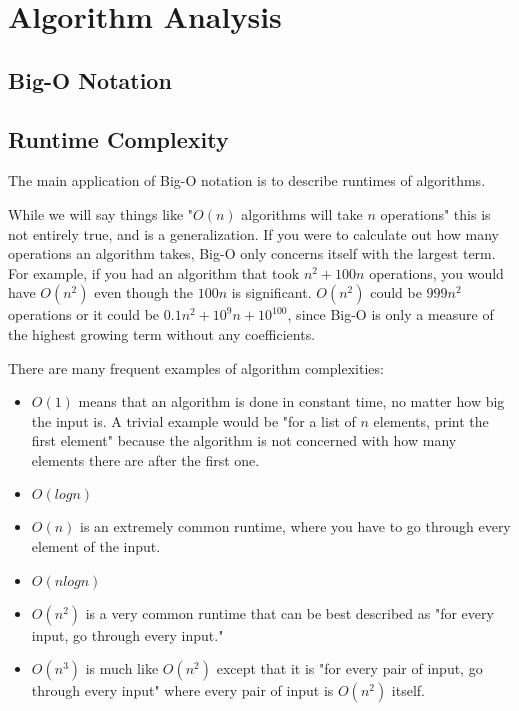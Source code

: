 \section{Algorithm Analysis}

\subsection{Big-O Notation}


\subsection{Runtime Complexity}

The main application of Big-O notation is to describe runtimes of algorithms.

While we will say things like "$O(n)$ algorithms will take $n$ operations" this is not entirely true, and is a generalization. If you were to calculate out how many operations an algorithm takes, Big-O only concerns itself with the largest term. For example, if you had an algorithm that took $n^2 + 100n$ operations, you would have $O(n^2)$ even though the $100n$ is significant. $O(n^2)$ could be $999n^2$ operations or it could be $0.1n^2 + 10^9n + 10^{100}$, since Big-O is only a measure of the highest growing term without any coefficients.

There are many frequent examples of algorithm complexities:

\begin{itemize}
\item $O(1)$ means that an algorithm is done in constant time, no matter how big the input is. A trivial example would be "for a list of $n$ elements, print the first element" because the algorithm is not concerned with how many elements there are after the first one.
\item $O(log n)$
\item $O(n)$ is an extremely common runtime, where you have to go through every element of the input.
\item $O(n log n)$
\item $O(n^2)$ is a very common runtime that can be best described as "for every input, go through every input."
\item $O(n^3)$ is much like $O(n^2)$ except that it is "for every pair of input, go through every input" where every pair of input is $O(n^2)$ itself.
\end{itemize}

